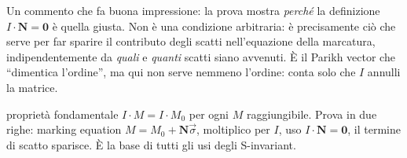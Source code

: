 Un commento che fa buona impressione: la prova mostra \emph{perché} la definizione $I\cdot\mathbf{N}=\mathbf{0}$ è quella giusta. Non è una condizione arbitraria: è precisamente ciò che serve per far sparire il contributo degli scatti nell'equazione della marcatura, indipendentemente da \emph{quali} e \emph{quanti} scatti siano avvenuti. È il Parikh vector che ``dimentica l'ordine'', ma qui non serve nemmeno l'ordine: conta solo che $I$ annulli la matrice.

\begin{puntochiave}{proprietà fondamentale}
$I\cdot M = I\cdot M_0$ per ogni $M$ raggiungibile. Prova in due righe: marking equation $M=M_0+\mathbf{N}\vec\sigma$, moltiplico per $I$, uso $I\cdot\mathbf{N}=\mathbf{0}$, il termine di scatto sparisce. È la base di tutti gli usi degli S-invariant.
\end{puntochiave}
